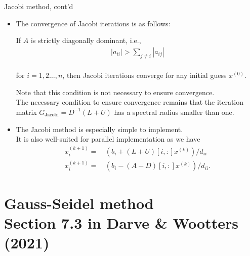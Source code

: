 \documentclass[t,usepdftitle=false]{beamer}
\begin{document}
\begin{frame}{Jacobi method, cont'd}
\begin{itemize}
\item The convergence of Jacobi iterations is as follows:
\begin{theorem}
If $A$ is strictly diagonally dominant, i.e.,\vspace{-.2cm}
\begin{align*}
|a_{ii}|>\sum_{j\neq i}|a_{ij}|
\end{align*}
\vspace{-.5cm}\\
for $i=1,2\dots,n$, then Jacobi iterations converge for any initial guess $x^{(0)}$.
\end{theorem}
Note that this condition is not necessary to ensure convergence.\vspace{.1cm}\\
The necessary condition to ensure convergence remains that the iteration matrix $G_{\mathrm{Jacobi}}=D^{-1}(L+U)$ has a spectral radius smaller than one.\vspace{.1cm}
\item The Jacobi method is especially simple to implement.\vspace{.1cm}\\
It is also well-suited for parallel implementation as we have\vspace{-.05cm}
\begin{align*}
x_i^{(k+1)}=&\,\left(b_i+(L+U)[i,:]x^{(k)}\right)/d_{ii}\\
x_i^{(k+1)}=&\,\left(b_i-(A-D)[i,:]x^{(k)}\right)/d_{ii}.
\end{align*}
\end{itemize}
\end{frame}

\section{Gauss-Seidel method\\{\small Section 7.3 in Darve \& Wootters (2021)}}
\end{document}
